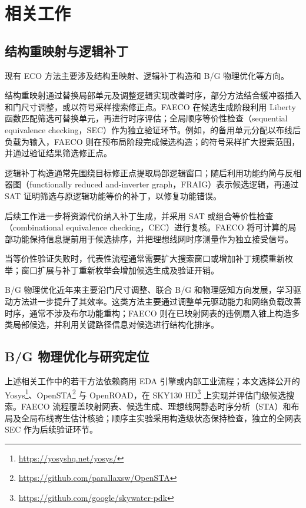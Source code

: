 \documentclass[twocolumn,10pt,fontset=windows]{ctexart}
\begin{document}
\section{相关工作}

\subsection{结构重映射与逻辑补丁}
现有 ECO 方法主要涉及结构重映射、逻辑补丁构造和 B/G 物理优化等方向。

结构重映射通过替换局部单元及调整逻辑实现改善时序，部分方法结合缓冲器插入和门尺寸调整\cite{ho2010eco}，或以符号采样搜索修正点\cite{kravets2019symbolic}。FAECO 在候选生成阶段利用 Liberty 函数匹配筛选可替换单元，再进行时序评估；全局顺序等价性检查（sequential equivalence checking，SEC）作为独立验证环节。例如，\cite{ho2010eco}的备用单元分配以布线后负载为输入，FAECO 则在预布局阶段完成候选构造；\cite{kravets2019symbolic}的符号采样扩大搜索范围，并通过验证结果筛选修正点。

逻辑补丁构造通常先围绕目标修正点提取局部逻辑窗口；随后利用功能约简与反相器图（functionally reduced and-inverter graph，FRAIG）表示候选逻辑，再通过 SAT 证明筛选与原逻辑功能等价的补丁，以修复功能错误\cite{jiang2010fraig,jiang2016resource}。

后续工作进一步将资源代价纳入补丁生成，并采用 SAT 或组合等价性检查（combinational equivalence checking，CEC）进行复核\cite{jiang2016resource,zhong2024stp}。FAECO 将可计算的局部功能保持信息提前用于候选排序，并把理想线网时序测量作为独立接受信号。

当等价性验证失败时，代表性流程通常需要扩大搜索窗口或增加补丁规模重新枚举\cite{zhuo2018patch}；窗口扩展与补丁重新枚举会增加候选生成及验证开销。

B/G 物理优化近年来主要沿门尺寸调整、联合 B/G 和物理感知方向发展\cite{liu2021rlsizer,huang2025phys,chen2024aito,zhang2025buffalo}，学习驱动方法\cite{chen2024aito,zhang2025buffalo}进一步提升了其效率。这类方法主要通过调整单元驱动能力和网络负载改善时序，通常不涉及布尔功能重构；FAECO 则在已映射网表的违例扇入锥上构造多类局部候选，并利用关键路径信息对候选进行结构化排序。

\subsection{B/G 物理优化与研究定位}
上述相关工作中的若干方法依赖商用 EDA 引擎或内部工业流程；本文选择公开的 Yosys\footnote{\url{https://yosyshq.net/yosys/}}、OpenSTA\footnote{\url{https://github.com/parallaxsw/OpenSTA}} 与 OpenROAD\cite{openroad}，在 SKY130 HD\footnote{\url{https://github.com/google/skywater-pdk}} 上实现并评估门级候选搜索。FAECO 流程覆盖映射网表、候选生成、理想线网静态时序分析（STA）和布局及全局布线寄生估计核验；顺序主实验采用构造级状态保持检查，独立的全网表 SEC 作为后续验证环节。
\end{document}
